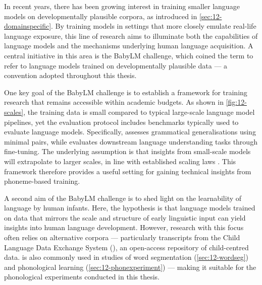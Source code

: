 In recent years, there has been growing interest in training smaller language models on developmentally plausible corpora, as introduced in \cref{sec:12-domainspecific}. By training models in settings that more closely emulate real-life language exposure, this line of research aims to illuminate both the capabilities of language models and the mechanisms underlying human language acquisition. A central initiative in this area is the BabyLM challenge, which coined the term  to refer to language models trained on developmentally plausible data --- a convention adopted throughout this thesis.

One key goal of the BabyLM challenge is to establish a framework for training research that remains accessible within academic budgets. As shown in \cref{fig:12-scales}, the training data is small compared to typical large-scale language model pipelines, yet the evaluation protocol includes benchmarks typically used to evaluate language models. Specifically, \blimp assesses grammatical generalisations using minimal pairs, while \glue evaluates downstream language understanding tasks through fine-tuning. The underlying assumption is that insights from small-scale models will extrapolate to larger scales, in line with established scaling laws \citep{kaplan2020scaling}. This framework therefore provides a useful setting for gaining technical insights from phoneme-based training.%

A second aim of the BabyLM challenge is to shed light on the learnability of language by human infants. Here, the hypothesis is that language models trained on data that mirrors the scale and structure of early linguistic input can yield insights into human language development. However, research with this focus often relies on alternative corpora --- particularly transcripts from the Child Language Data Exchange System (\childes), an open-access repository of child-centred data. \childes is also commonly used in studies of word segmentation (\cref{sec:12-wordseg}) and phonological learning (\cref{sec:12-phonexperiment}) --- making it suitable for the phonological experiments conducted in this thesis.


